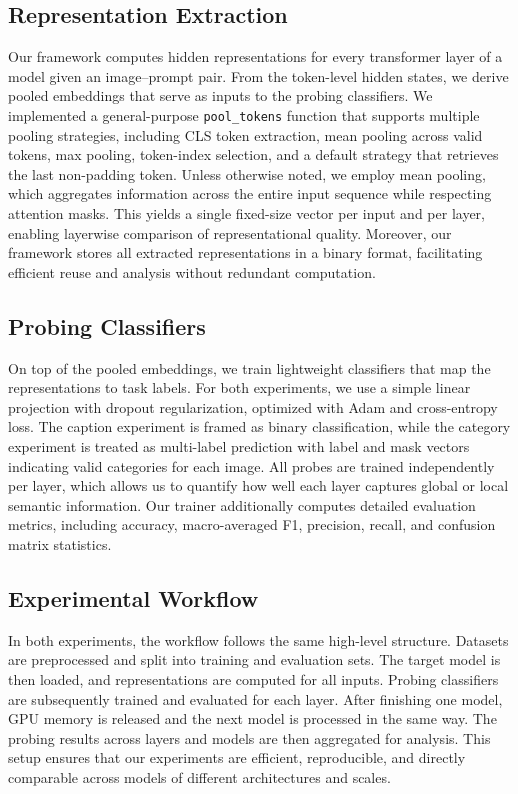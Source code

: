 \documentclass[11pt]{article}
\begin{document}
\subsection{Representation Extraction}
Our framework computes hidden representations for every transformer layer of a model
given an image--prompt pair. From the token-level hidden states, we derive pooled embeddings
that serve as inputs to the probing classifiers. We implemented a general-purpose
\texttt{pool\_tokens} function that supports multiple pooling strategies, including
CLS token extraction, mean pooling across valid tokens, max pooling, token-index selection,
and a default strategy that retrieves the last non-padding token. Unless otherwise noted,
we employ mean pooling, which aggregates information across the entire input sequence
while respecting attention masks. This yields a single fixed-size vector per input
and per layer, enabling layerwise comparison of representational quality.
Moreover, our framework stores all extracted representations in a binary format,
facilitating efficient reuse and analysis without redundant computation.


\subsection{Probing Classifiers}
On top of the pooled embeddings, we train lightweight classifiers that map the
representations to task labels. For both experiments, we use a simple linear
projection with dropout regularization, optimized with Adam and cross-entropy loss.
The caption experiment is framed as binary classification, while the category experiment
is treated as multi-label prediction with label and mask vectors indicating valid
categories for each image. All probes are trained independently per layer, which allows
us to quantify how well each layer captures global or local semantic information.
Our trainer additionally computes detailed evaluation metrics, including accuracy, macro-averaged F1, precision, recall, and confusion matrix
statistics.

\subsection{Experimental Workflow}
In both experiments, the workflow follows the same high-level structure.
Datasets are preprocessed and split into training and evaluation sets. The target model is then
loaded, and representations are computed for all inputs. Probing classifiers are subsequently trained
and evaluated for each layer. After finishing one model, GPU memory is released
and the next model is processed in the same way. The probing results across
layers and models are then aggregated for analysis. This setup ensures that
our experiments are efficient, reproducible, and directly comparable across
models of different architectures and scales.
\end{document}
